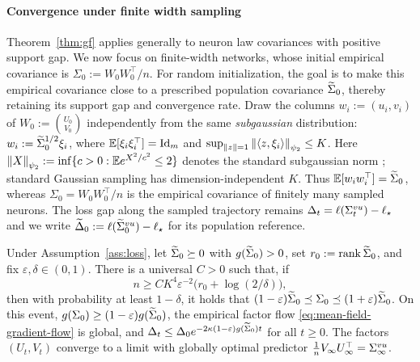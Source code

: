\paragraph{Convergence under finite width sampling}
Theorem~\ref{thm:gf} applies generally to neuron law covariances with positive support gap.
We now focus on finite-width networks, whose initial empirical covariance is $\Sigma_0:=W_0W_0^\top/n$.
For random initialization, the goal is to make this
empirical covariance close to a prescribed population covariance
$\widetilde\Sigma_0$, thereby retaining its support gap and convergence rate.
Draw the columns $w_i:=(u_i,v_i)$ of $W_0:=\binom{U_0}{V_0}$ independently
from the same \emph{subgaussian} distribution:
$w_i:=\widetilde\Sigma_0^{1/2}\xi_i$, where $\mathbb E[\xi_i\xi_i^\top]=\mathrm{Id}_m$ and $\sup_{\left\lVert z \right\rVert=1}\left\lVert \langle z,\xi_i\rangle \right\rVert_{\psi_2}\le K$.
Here $\left\lVert X \right\rVert_{\psi_2}:=\inf\{c>0:\mathbb E e^{X^2/c^2}\le2\}$ denotes the standard subgaussian norm \citep{Vershynin2018};
standard Gaussian sampling has dimension-independent $K$.
Thus $\mathbb E[w_iw_i^\top]=\widetilde\Sigma_0$, whereas $\Sigma_0=W_0W_0^\top/n$ is the empirical covariance of finitely many sampled neurons.
The loss gap along the sampled trajectory remains $\Delta_t=\ell(\Sigma^{vu}_t)-\ell_\star$ and we write $\widetilde\Delta_0:=\ell(\widetilde{\Sigma}^{vu}_0)-\ell_\star$ for its population reference.

\begin{corollary}
\label{cor:finite-width}\label{thm:finite-width}
Under Assumption~\ref{ass:loss}, let $\widetilde\Sigma_0\succeq0$ with
$g(\widetilde\Sigma_0)>0$, set $r_0:=\operatorname{rank}\widetilde\Sigma_0$, and fix
$\varepsilon,\delta\in(0,1)$.
There is a universal $C>0$ such that, if
\begin{equation}\label{eq:width}
 n\ge CK^4\varepsilon^{-2}\bigl(r_0+\log(2/\delta)\bigr),
\end{equation}
then with probability at least $1-\delta$, it holds that
\((1-\varepsilon)\widetilde\Sigma_0\preceq\Sigma_0 \preceq(1+\varepsilon)\widetilde\Sigma_0\).
On this event,
$g(\Sigma_0)\ge(1-\varepsilon)g(\widetilde\Sigma_0)$,
the empirical factor flow \eqref{eq:mean-field-gradient-flow} is global, and
\(\Delta_t\le\Delta_0e^{-2\kappa(1-\varepsilon)g(\widetilde\Sigma_0)t}\)
for all $t\ge0$.
The factors $(U_t, V_t)$ converge to a limit with globally optimal predictor $\frac{1}{n} V_\infty U_\infty^\top = \Sigma^{vu}_\infty$.
\end{corollary}


